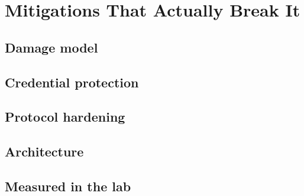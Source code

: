 \section{Mitigations That Actually Break It}
\unwritten
\label{sec:mitigation}

\subsection{Damage model}
\unwritten

\subsection{Credential protection}
\unwritten

\subsection{Protocol hardening}
\unwritten

\subsection{Architecture}
\unwritten

\subsection{Measured in the lab}
\unwritten
